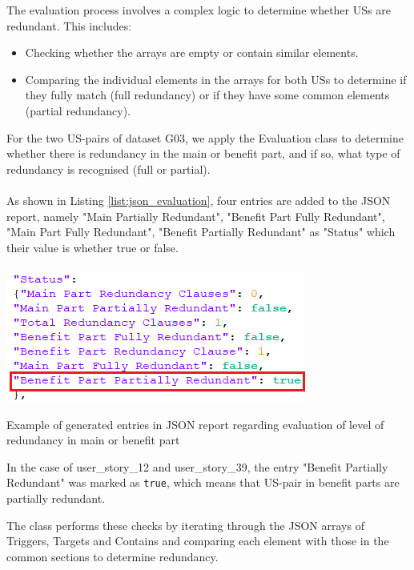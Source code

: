 The evaluation process involves a complex logic to determine whether USs are redundant. This includes:
\begin{itemize}
	\item Checking whether the arrays are empty or contain similar elements.
	\item Comparing the individual elements in the arrays for both USs to determine if they fully match (full redundancy) or if they have some common elements (partial redundancy).
\end{itemize}
\begin{example}
	For the two US-pairs of dataset G03, we apply the Evaluation class to determine whether there is redundancy in the main or benefit part, and if so, what type of redundancy is recognised (full or partial).\\\\
	As shown in Listing \ref{list:json_evaluation}, four entries are added to the JSON report, namely "Main Partially Redundant", "Benefit Part Fully Redundant",
	"Main Part Fully Redundant", "Benefit Partially Redundant" as "Status" which their value is whether true or false. 
	\begin{MyListing}
		\paragraph{}
		
		\centering
		\includegraphics[scale=0.7]{Listing/json_evaluation.png}
		\caption{Example of generated entries in JSON report regarding evaluation of level of redundancy in main or benefit part}\label{list:json_evaluation}
		
	\end{MyListing}	
	
	In the case of user\_story\_12 and user\_story\_39, the entry "Benefit Partially Redundant" was marked as \texttt{true}, which means that US-pair in benefit parts are partially redundant.
	
\end{example}
The class performs these checks by iterating through the JSON arrays of Triggers, Targets and Contains and comparing each element with those in the common sections to determine redundancy.


